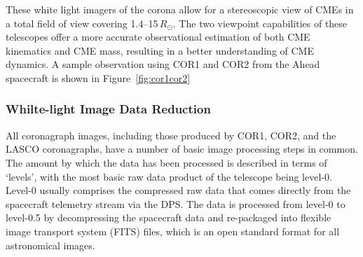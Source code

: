 These white light imagers of the corona allow for a stereoscopic view of CMEs in a total field of view covering 1.4--15\,$R_{\odot}$. The two viewpoint capabilities of these telescopes offer a more accurate observational estimation of both CME kinematics and CME mass, resulting in a better understanding of CME dynamics. A sample observation using COR1 and COR2 from the Ahead spacecraft is shown in Figure~\ref{fig:cor1cor2}


\subsubsection{Whilte-light Image Data Reduction}

All coronagraph images, including those produced by COR1, COR2, and the LASCO coronagraphs, have a number of basic image processing steps in common. The amount by which the data has been processed is described in terms of `levels', with the most basic raw data product of the telescope being level-0. Level-0 usually comprises the compressed raw data that comes directly from the spacecraft telemetry stream via the DPS. The data is processed from level-0 to level-0.5 by decompressing the spacecraft data and re-packaged into flexible image transport system (FITS) files, which is an open standard format for all astronomical images. 

